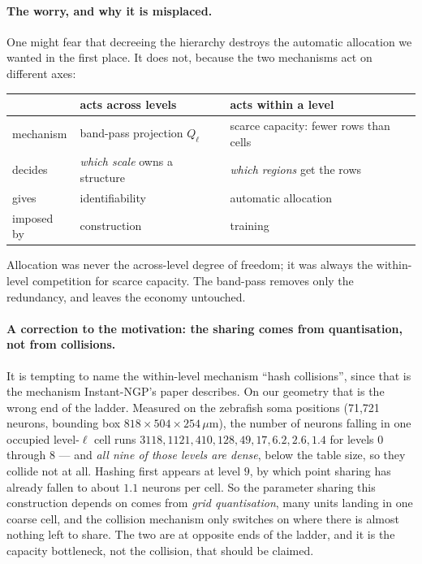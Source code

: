 \documentclass[11pt,a4paper]{article}
\begin{document}
\paragraph{The worry, and why it is misplaced.} One might fear that decreeing the hierarchy
destroys the automatic allocation we wanted in the first place. It does not, because the
two mechanisms act on different axes:

\begin{center}
\begin{tabular}{@{}lll@{}}
\toprule
& \textbf{acts across levels} & \textbf{acts within a level} \\
\midrule
mechanism & band-pass projection $Q_\ell$ & scarce capacity: fewer rows than cells \\
decides & \emph{which scale} owns a structure & \emph{which regions} get the rows \\
gives & identifiability & automatic allocation \\
imposed by & construction & training \\
\bottomrule
\end{tabular}
\end{center}

\noindent
Allocation was never the across-level degree of freedom; it was always the within-level
competition for scarce capacity. The band-pass removes only the redundancy, and leaves the
economy untouched.

\paragraph{A correction to the motivation: the sharing comes from quantisation, not from
collisions.} It is tempting to name the within-level mechanism ``hash collisions'', since
that is the mechanism Instant-NGP's paper describes. On our geometry that is the wrong end
of the ladder. Measured on the zebrafish soma positions (71{,}721 neurons, bounding box
$818 \times 504 \times 254\,\mu$m), the number of neurons falling in one occupied level-$\ell$
cell runs $3118, 1121, 410, 128, 49, 17, 6.2, 2.6, 1.4$ for levels $0$ through $8$ --- and
\emph{all nine of those levels are dense}, below the table size, so they collide not at all.
Hashing first appears at level $9$, by which point sharing has already fallen to about
$1.1$ neurons per cell. So the parameter sharing this construction depends on comes from
\emph{grid quantisation}, many units landing in one coarse cell, and the collision mechanism
only switches on where there is almost nothing left to share. The two are at opposite ends
of the ladder, and it is the capacity bottleneck, not the collision, that should be claimed.
\end{document}
